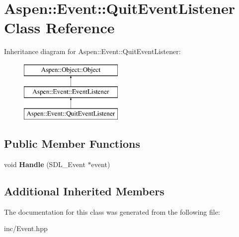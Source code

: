 \hypertarget{class_aspen_1_1_event_1_1_quit_event_listener}{\section{Aspen\-:\-:Event\-:\-:Quit\-Event\-Listener Class Reference}
\label{class_aspen_1_1_event_1_1_quit_event_listener}
}
Inheritance diagram for Aspen\-:\-:Event\-:\-:Quit\-Event\-Listener\-:\begin{figure}[H]
\begin{center}
\leavevmode
\includegraphics[height=3.000000cm]{d3/d97/class_aspen_1_1_event_1_1_quit_event_listener}
\end{center}
\end{figure}
\subsection*{Public Member Functions}
\begin{DoxyCompactItemize}
\item 
\hypertarget{class_aspen_1_1_event_1_1_quit_event_listener_a58d965225baf29089b4abb738d2c9a57}{void {\bfseries Handle} (S\-D\-L\-\_\-\-Event $\ast$event)}\label{class_aspen_1_1_event_1_1_quit_event_listener_a58d965225baf29089b4abb738d2c9a57}

\end{DoxyCompactItemize}
\subsection*{Additional Inherited Members}


The documentation for this class was generated from the following file\-:\begin{DoxyCompactItemize}
\item 
inc/Event.\-hpp\end{DoxyCompactItemize}
